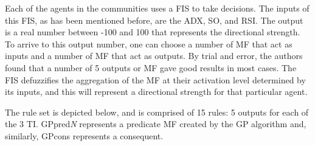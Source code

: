 \documentclass[a4paper,twoside]{article}
\begin{document}


Each of the agents in the communities uses a FIS to take
decisions. The inputs of this FIS, as has been mentioned before, are
the ADX, SO, and RSI. The output is a real number between -100 and 100
that represents the directional strength. To arrive to this output
number, one can choose a number of MF that act as inputs and a number
of MF that act as outputs. By trial and error, the authors found that
a number of 5 outputs or MF gave good results in most cases. %
The FIS
defuzzifies the aggregation of the MF at their activation level
determined by its inputs, and this will represent a directional
strength for that particular agent. 

The rule set is depicted below, and is comprised of 15 rules: 5
outputs for each of the 3 TI. GPpred\textit{N} represents a predicate
MF created by the GP algorithm and, similarly, GPcons
represents a consequent. 
\end{document}
